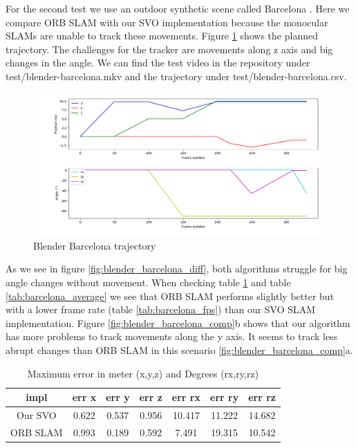 \documentclass[11pt,a4paper,titlepage,oneside]{report}
\begin{document}
For the second test we use an outdoor synthetic scene called Barcelona \cite{blender}. Here we compare ORB SLAM with our SVO implementation because the monocular SLAMs are unable to track these movements. Figure \ref{fig:blender_barcelona_traj} shows the planned trajectory. The challenges for the tracker are movements along z axis and big changes in the angle. We can find the test video in the repository under test/blender-barcelona.mkv and the trajectory under test/blender-barcelona.csv.

\begin{figure}[H]
  \includegraphics[width=1.0\textwidth]{img/blender_barcelona_traj.png}
  \caption{Blender Barcelona trajectory}\label{fig:blender_barcelona_traj}
\end{figure}

As we see in figure \ref{fig:blender_barcelona_diff}, both algorithms struggle for big angle changes without movement. When checking table \ref{tab:barcelona_maximas} and table \ref{tab:barcelona_average} we see that ORB SLAM performs slightly better but with a lower frame rate (table \ref{tab:barcelona_fps}) than our SVO SLAM implementation. Figure \ref{fig:blender_barcelona_comp}b shows that our algorithm has more problems to track movements along the y axis. It seems to track less abrupt changes than ORB SLAM in this scenario \ref{fig:blender_barcelona_comp}a.

\begin{table}[H]
  \centering
  \begin{tabular}{|c|c|c|c|c|c|c|}
  impl & err x & err y & err z & err rx & err ry & err rz\\
  \hline
  Our SVO & 0.622 & 0.537 & 0.956 & 10.417 & 11.222 & 14.682\\
  ORB SLAM& 0.993 & 0.189 & 0.592 & 7.491 & 19.315 & 10.542
\end{tabular}
\caption{Maximum error in meter (x,y,z) and Degrees (rx,ry,rz)}
\label{tab:barcelona_maximas}
\end{table}
\end{document}
